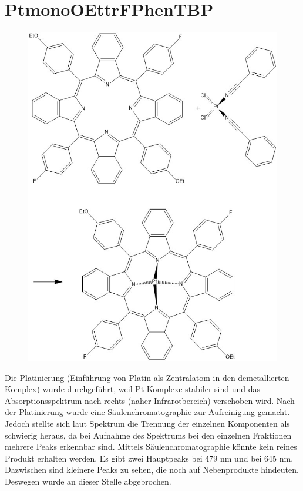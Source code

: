 \section{PtmonoOEttrFPhenTBP}
\begin{figure}[!htpb]
\centering
\includegraphics[scale=0.5]{graphics/Platinierung}
\end{figure}
Die Platinierung (Einführung von Platin als Zentralatom in den demetallierten Komplex) wurde durchgeführt, weil Pt-Komplexe stabiler sind und das Absorptionsspektrum nach rechts (naher Infrarotbereich) verschoben wird.
Nach der Platinierung wurde eine Säulenchromatographie zur Aufreinigung gemacht. Jedoch stellte sich laut Spektrum die Trennung der einzelnen Komponenten als schwierig heraus, da bei Aufnahme des Spektrums bei den einzelnen Fraktionen mehrere Peaks erkennbar sind. Mittels Säulenchromatographie könnte kein reines Produkt erhalten werden. Es gibt zwei Hauptpeaks bei 479 nm und bei 645 nm. Dazwischen sind kleinere Peaks zu sehen, die noch auf Nebenprodukte hindeuten. Deswegen wurde an dieser Stelle abgebrochen.

